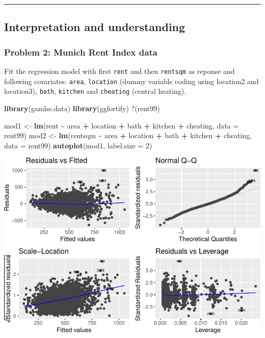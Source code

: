 \documentclass[
]{article}
\newenvironment{Shaded}{\begin{snugshade}}{\end{snugshade}}
\newcommand{\AttributeTok}[1]{\textcolor[rgb]{0.13,0.29,0.53}{#1}}
\newcommand{\DecValTok}[1]{\textcolor[rgb]{0.00,0.00,0.81}{#1}}
\newcommand{\FunctionTok}[1]{\textcolor[rgb]{0.13,0.29,0.53}{\textbf{#1}}}
\newcommand{\NormalTok}[1]{#1}
\newcommand{\OtherTok}[1]{\textcolor[rgb]{0.56,0.35,0.01}{#1}}
\newcommand{\SpecialCharTok}[1]{\textcolor[rgb]{0.81,0.36,0.00}{\textbf{#1}}}
\newcommand{\StringTok}[1]{\textcolor[rgb]{0.31,0.60,0.02}{#1}}
\begin{document}
\begin{center}\rule{0.5\linewidth}{0.5pt}\end{center}

\hypertarget{interpretation-and-understanding}{%
\subsection{Interpretation and
understanding}\label{interpretation-and-understanding}}

\hypertarget{problem-2-munich-rent-index-data}{%
\subsubsection{Problem 2: Munich Rent Index
data}\label{problem-2-munich-rent-index-data}}

Fit the regression model with first \texttt{rent} and then
\texttt{rentsqm} as reponse and following covariates: \texttt{area},
\texttt{location} (dummy variable coding using location2 and location3),
\texttt{bath}, \texttt{kitchen} and \texttt{cheating} (central heating).

\begin{Shaded}
\begin{Highlighting}[]
\FunctionTok{library}\NormalTok{(gamlss.data)}
\FunctionTok{library}\NormalTok{(ggfortify)}
\StringTok{\textasciigrave{}}\AttributeTok{?}\StringTok{\textasciigrave{}}\NormalTok{(rent99)}

\NormalTok{mod1 }\OtherTok{\textless{}{-}} \FunctionTok{lm}\NormalTok{(rent }\SpecialCharTok{\textasciitilde{}}\NormalTok{ area }\SpecialCharTok{+}\NormalTok{ location }\SpecialCharTok{+}\NormalTok{ bath }\SpecialCharTok{+}\NormalTok{ kitchen }\SpecialCharTok{+}\NormalTok{ cheating, }\AttributeTok{data =}\NormalTok{ rent99)}
\NormalTok{mod2 }\OtherTok{\textless{}{-}} \FunctionTok{lm}\NormalTok{(rentsqm }\SpecialCharTok{\textasciitilde{}}\NormalTok{ area }\SpecialCharTok{+}\NormalTok{ location }\SpecialCharTok{+}\NormalTok{ bath }\SpecialCharTok{+}\NormalTok{ kitchen }\SpecialCharTok{+}\NormalTok{ cheating, }\AttributeTok{data =}\NormalTok{ rent99)}
\FunctionTok{autoplot}\NormalTok{(mod1, }\AttributeTok{label.size =} \DecValTok{2}\NormalTok{)}
\end{Highlighting}
\end{Shaded}

\includegraphics{2MLR_files/figure-latex/unnamed-chunk-26-1.pdf}
\end{document}
